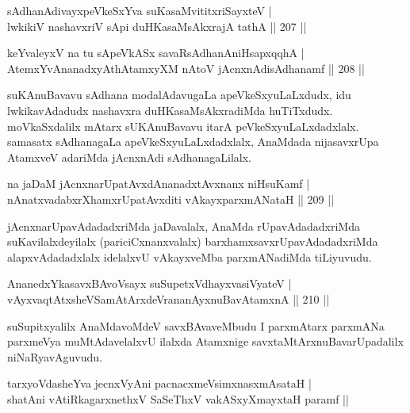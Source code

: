 
\begin{shl}
sAdhanAdivayxpeVkeSxYva suKasaMvititxriSayxteV |\\
lwkikiV nashavxriV sA\s pi duHKasaMsAkxrajA tathA \hfill || 207 ||
\end{shl}

\begin{shl}
keYvaleyxV na tu sApeVkASx savaRsAdhanAniHsapxqqhA |\\
AtemxYvA\s \s nanadxyAthAtamxyXM nAtoV jAcnxnAdisAdhanamf \hfill || 208 ||
\end{shl}

\begin{artha}
suKAnuBavavu sAdhana modalAdavugaLa apeVkeSxyuLaLxdudx, idu lwkikavAdadudx nashavxra duHKasaMsAkxradiMda huTiTxdudx. moVkaSxdalilx mAtarx sUKAnuBavavu itarA peVkeSxyuLaLxdadxlalx. samasatx sAdhanagaLa apeVkeSxyuLaLxdadxlalx, AnaMdada nijasavxrUpa AtamxveV adariMda jAcnxnAdi sAdhanagaLilalx.
\end{artha}

\begin{shl}
na jaDaM jAcnxnarUpatAvxdAnanadxtAvxnanx niHsuKamf |\\
nAnatxvadabxrXhamxrUpatAvxditi vAkayxparxmANataH \hfill || 209 ||
\end{shl}

\begin{artha}%
jAcnxnarUpavAdadadxriMda jaDavalalx, AnaMda rUpavAdadadxriMda suKavilalxdeyilalx (pariciCxnanxvalalx) barxhamxsavxrUpavAdadadxriMda alapxvAdadadxlalx idelalxvU vAkayxveMba parxmANadiMda tiLiyuvudu.
\end{artha}

\begin{shl}
AnanedxYkasavxBAvoV\s sayx suSupetxV\s dhayxvasiVyateV |\\
vAyxvaqtAtxsheVSamAtArxdeVrananAyxnuBavAtamxnA \hfill || 210 ||
\end{shl}

\begin{artha}
suSupitxyalilx AnaMdavoMdeV savxBAvaveMbudu I parxmAtarx parxmANa parxmeVya muMtAdavelalxvU ilalxda Atamxnige savxtaMtArxnuBavarUpadalilx niNaRyavAguvudu.
\end{artha}


\begin{shl}
tarxyoVdasheYva jecnxVyAni pacnacxmeV\s simxnasxmAsataH |\\
shatAni vAtiRkagarxnethxV SaSeThxV vakASxyXmayxtaH paramf ||
\end{shl}

